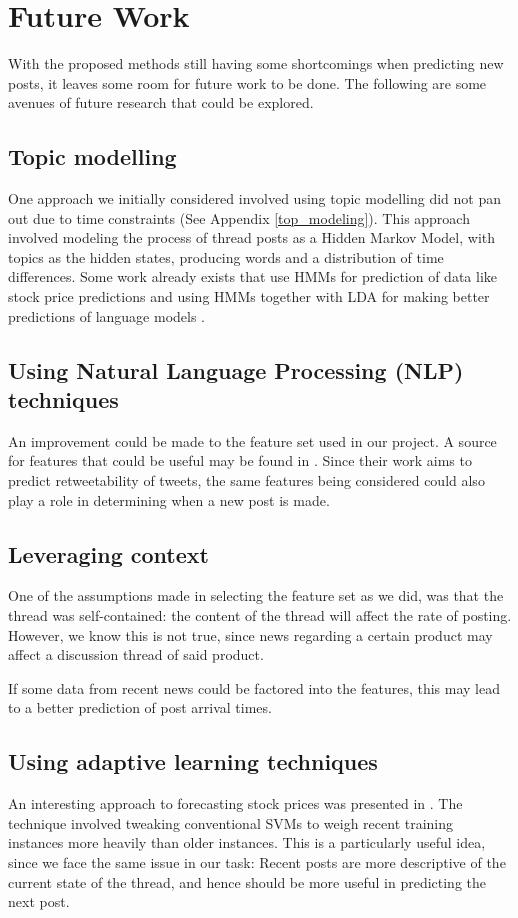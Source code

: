 \section{Future Work}
With the proposed methods still having some shortcomings when predicting new 
posts, it leaves some room for future work to be done. The following are some 
avenues of future research that could be explored.

\subsection{Topic modelling}
One approach we initially considered involved using topic modelling did not pan 
out due to time constraints (See Appendix \ref{top_modeling}). This approach 
involved modeling the process of thread posts as a Hidden Markov Model, with 
topics as the hidden states, producing words and a distribution of time 
differences. Some work already exists that use HMMs for prediction of data like 
stock price predictions \cite{Gonzalez2005} and using HMMs together with LDA for 
making better predictions of language models \cite{Hsu2006}.

\subsection{Using Natural Language Processing (NLP) techniques}
An improvement could be made to the feature set used in our project. A source 
for features that could be useful may be found in . Since their 
work aims to predict retweetability of tweets, the same features being 
considered could also play a role in determining when a new post is made.

\subsection{Leveraging context}
One of the assumptions made in selecting the feature set as we did, was that the 
thread was self-contained: the content of the thread will affect the rate of 
posting. However, we know this is not true, since news regarding a certain 
product may affect a discussion thread of said product.

If some data from recent news could be factored into the features, this may lead 
to a better prediction of post arrival times.

\subsection{Using adaptive learning techniques}
An interesting approach to forecasting stock prices was presented in 
. The technique involved tweaking conventional SVMs to weigh 
recent training instances more heavily than older instances. This is a 
particularly useful idea, since we face the same issue in our task: Recent posts 
are more descriptive of the current state of the thread, and hence should be 
more useful in predicting the next post.
